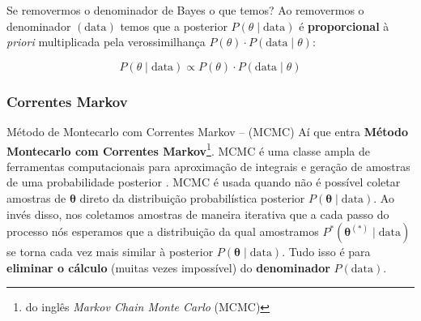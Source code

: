 \begin{frame}{Se removermos o denominador de Bayes o que temos?}
  Ao removermos o denominador $(\text{data})$ temos que a posterior
  $P(\theta \mid \text{data})$ é \textbf{proporcional} à \textit{priori}
  multiplicada pela verossimilhança $P(\theta) \cdot P(\text{data} \mid \theta)$:

  $$P(\theta \mid \text{data}) \propto P(\theta) \cdot P(\text{data} \mid \theta)$$

\end{frame}

\subsubsection{Correntes Markov}
\begin{frame}{Método de Montecarlo com Correntes Markov -- (MCMC)}
  Aí que entra \textbf{Método Montecarlo com Correntes Markov}\footnote{do inglês
  \textit{Markov Chain Monte Carlo} (MCMC)}.
  \vfill
  MCMC é uma classe ampla de ferramentas computacionais para aproximação
  de integrais e geração de amostras de uma probabilidade posterior
  \parencite{brooksHandbookMarkovChain2011}.
  \vfill
  MCMC é usada quando não é possível coletar amostras de $\boldsymbol{\theta}$
  direto da distribuição probabilística posterior
  $P(\boldsymbol{\theta} \mid \text{data})$.
  Ao invés disso, nos coletamos amostras de maneira iterativa que a cada passo do
  processo nós esperamos que a distribuição da qual amostramos
  $P^*(\boldsymbol{\theta}^{(*)} \mid \text{data})$
  se torna cada vez mais similar à posterior $P(\boldsymbol{\theta} \mid \text{data})$.
  \vfill
  Tudo isso é para \textbf{eliminar o cálculo} (muitas vezes impossível) do \textbf{denominador} $P(\text{data})$.
\end{frame}


